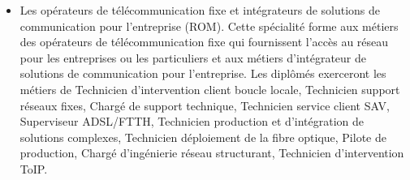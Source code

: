 \begin{itemize}[leftmargin=5ex]
	\item Les opérateurs de télécommunication fixe et intégrateurs de solutions de communication pour l'entreprise (ROM). Cette spécialité forme aux métiers des opérateurs de télécommunication fixe qui fournissent l'accès au réseau pour les entreprises ou les particuliers et aux métiers d'intégrateur de solutions de communication pour l'entreprise. Les diplômés exerceront les métiers de Technicien d’intervention client boucle locale, Technicien support réseaux fixes, Chargé de support technique, Technicien service client SAV, Superviseur ADSL/FTTH, Technicien production et d'intégration de solutions complexes, Technicien déploiement de la fibre optique, Pilote de production, Chargé d'ingénierie réseau structurant, Technicien d’intervention ToIP.
\end{itemize}